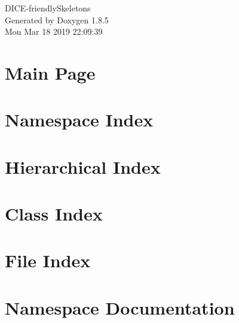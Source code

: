 \documentclass[twoside]{book}
\newcommand{\clearemptydoublepage}{%
  \newpage{\pagestyle{empty}\cleardoublepage}%
}
\begin{document}
\hypersetup{pageanchor=false}
\begin{titlepage}
\vspace*{7cm}
\begin{center}%
{\Large D\-I\-C\-E-\/friendly\-Skeletons }\\
\vspace*{1cm}
{\large Generated by Doxygen 1.8.5}\\
\vspace*{0.5cm}
{\small Mon Mar 18 2019 22:09:39}\\
\end{center}
\end{titlepage}
\clearemptydoublepage
\tableofcontents
\clearemptydoublepage
{}
\hypersetup{pageanchor=true}

\chapter{Main Page}
\label{index}\hypertarget{index}{}
\chapter{Namespace Index}

\chapter{Hierarchical Index}

\chapter{Class Index}

\chapter{File Index}

\chapter{Namespace Documentation}






\end{document}
